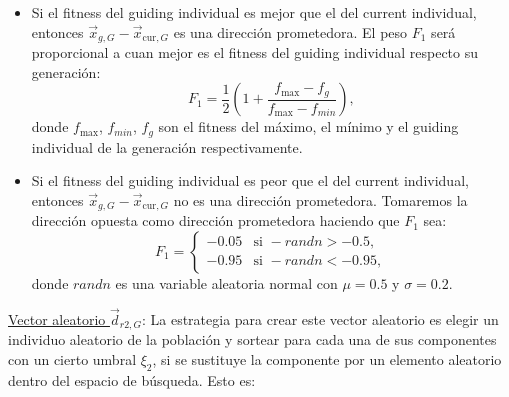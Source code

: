 \documentclass{article}
\begin{document}
\begin{itemize}
    \item Si el fitness del guiding individual es mejor que el del current individual, entonces $\vec{x}_{g,G}-\vec{x}_{\text{cur}, G}$ es una dirección prometedora. El peso $F_{1}$ será proporcional a cuan mejor es el fitness del guiding individual respecto su generación:
\begin{equation}
	F_{1}=\dfrac{1}{2}\left(1+\dfrac{f_{\max}-f_{g}}{f_{\max}-f_{min}}\right),
	\label{F1_Pos}
\end{equation}
donde $f_{\max}$, $f_{min}$, $f_{g}$ son el fitness del máximo, el mínimo y el guiding individual de la generación respectivamente.
    \item Si el fitness del guiding individual es peor que el del current individual, entonces $\vec{x}_{g,G}-\vec{x}_{\text{cur}, G}$ no es una dirección prometedora. Tomaremos la dirección opuesta como dirección prometedora haciendo que $F_{1}$ sea:
\begin{equation}
    F_{1} = \left\{\begin{array}{ll}
            -0.05 & \text{si }-randn>-0.5,\\
            -0.95 & \text{si }-randn<-0.95,
    \end{array}\right.
\label{F1_neg}
\end{equation}
donde $randn$ es una variable aleatoria normal con $\mu=0.5$ y $\sigma=0.2$.
\end{itemize}

\underline{Vector aleatorio $\vec{d}_{r2,G}$}: La estrategia para crear este vector aleatorio es elegir un individuo aleatorio de la población y sortear para cada una de sus componentes con un cierto umbral $\xi_2$, si se sustituye la componente por un elemento aleatorio dentro del espacio de búsqueda. Esto es:
\end{document}
